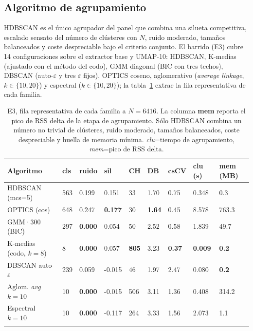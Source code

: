 \subsection{Algoritmo de agrupamiento}
\label{subsubsec:res-agrupamiento}
HDBSCAN es el único agrupador del panel que combina una silueta competitiva,
escalado sensato del número de clústeres con $N$, ruido moderado, tamaños
balanceados y coste despreciable bajo el criterio conjunto. El barrido (E3)
cubre 14 configuraciones sobre el extractor base y UMAP-10: HDBSCAN, K-medias
(ajustado con el método del codo), GMM diagonal (BIC con tres techos), DBSCAN
(auto-$\varepsilon$ y tres $\varepsilon$ fijos), OPTICS coseno, aglomerativo
(\textit{average linkage}, $k\in\{10, 20\}$) y espectral ($k\in\{10, 20\}$); la
tabla~\ref{tab:e3-summary-6416} extrae la fila representativa de cada familia.

{\footnotesize
\begin{longtable}{|p{2.4cm}|p{0.9cm}|p{1.0cm}|p{1.1cm}|p{0.8cm}|p{0.8cm}|p{0.9cm}|p{1.0cm}|p{1.0cm}|} \hline
  \textbf{Algoritmo} & \textbf{cls} & \textbf{ruido} & \textbf{sil} & \textbf{CH} & \textbf{DB} & \textbf{csCV} & \textbf{clu (s)} & \textbf{mem (MB)} \\ \hline
  \endhead
  HDBSCAN (mcs=5)        & 563 & 0.199 &  0.151 &  33 & 1.70 & 0.75 & 0.348 & 0.3 \\ \hline
  OPTICS (cos)           & 648 & 0.247 &  \textbf{0.177} &  30 & \textbf{1.64} & 0.45 & 8.578 & 763.3 \\ \hline
  GMM·300 (BIC)          & 297 & \textbf{0.000} &  0.054 &  50 & 2.52 & 0.58 & 1.839 & 49.7 \\ \hline
  K-medias (codo, $k=8$)   &   8 & \textbf{0.000} &  0.057 & \textbf{805} & 3.23 & \textbf{0.37} & \textbf{0.009} & \textbf{0.2} \\ \hline
  DBSCAN auto-$\varepsilon$ & 239 & 0.059 & -0.015 & 46 & 1.97 & 2.47 & 0.080 & \textbf{0.2} \\ \hline
  Aglom. \textit{avg} $k=10$ &  10 & \textbf{0.000} & -0.015 & 506 & 3.11 & 1.36 & 0.408 & 314.2 \\ \hline
  Espectral $k=10$       &  10 & \textbf{0.000} & -0.117 & 264 & 3.33 & 1.56 & 2.073 & 1.1 \\ \hline
  \caption[E3, fila representativa por familia a $N=6416$]{E3, fila representativa de cada familia a $N=6416$. La columna
  \textbf{mem} reporta el pico de RSS delta de la etapa de agrupamiento. Sólo
  HDBSCAN combina un número no trivial de clústeres, ruido moderado, tamaños
  balanceados, coste despreciable y huella de memoria mínima. \glosacalidad{}
  \textit{clu}=tiempo de agrupamiento, \textit{mem}=pico de RSS delta.}
  \label{tab:e3-summary-6416}
\end{longtable}
}

